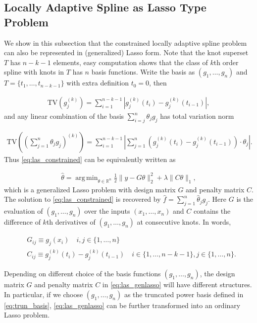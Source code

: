 \documentclass[a4paper]{article}
\DeclareMathOperator*{\argmin}{arg\,min}
\newcommand{\RR}{\mathbb{R}}
\begin{document}
\subsection{Locally Adaptive Spline as Lasso Type Problem}
\label{subsec:lasaslasso}
We show in this subsection that the constrained locally adaptive spline problem can also be represented in (generalized) Lasso form. Note that the knot superset $T$ has $n-k-1$ elements, easy computation shows that the class of $k$th order spline with knots in $T$ has $n$ basis functions. Write the basis as $(g_1,\ldots, g_n)$ and $T = \{t_1,\ldots, t_{n-k-1}\}$ with extra definition $t_0 = 0$, then

\begin{align*}
\text{TV}(g_j^{(k)}) = \sum_{i=1}^{n-k-1} |g_j^{(k)}(t_i) - g_j^{(k)}(t_{i-1})|,
\end{align*}
and any linear combination of the basis $\sum_{i=j}^n \theta_jg_j$ has total variation norm

\begin{align*}
\text{TV}((\sum_{j=1}^n\theta_jg_j)^{(k)}) = \sum_{i=1}^{n-k-1}|\sum_{j=1}^n (g_j^{(k)}(t_i) - g_j^{(k)}(t_{i-1}))\cdot\theta_j|.
\end{align*}
Thus \eqref{eq:las_constrained} can be equivalently written as

\begin{align}
\hat{\theta} = \argmin_{\theta\in\RR^n} \frac{1}{2}\|y-G\theta\|_2^2 + \lambda\|C\theta\|_1,
\label{eq:las_genlasso}
\end{align}
which is a generalized Lasso problem with design matrix $G$ and penalty matrix $C$. The solution to \eqref{eq:las_constrained} is recovered by $\hat{f} = \sum_{j=1}^n \hat{\theta}_jg_j$. Here $G$ is the evaluation of $(g_1,\ldots, g_n)$ over the inputs $(x_1,\ldots, x_n)$ and $C$ contains the difference of $k$th derivatives of $(g_1,\ldots, g_n)$ at consecutive knots. In words,

\begin{equation}
\begin{aligned}
&G_{ij} \equiv g_j(x_i) \quad i,j\in\{1,\ldots, n\}\\
&C_{ij} \equiv g_j^{(k)}(t_i) - g_j^{(k)}(t_{i-1}) \quad i\in\{1,\ldots, n-k-1\}, j\in\{1,\ldots, n\}.
\label{eq:lars_design}
\end{aligned}
\end{equation}

Depending on different choice of the basis functions $(g_1,\ldots, g_n)$, the design matrix $G$ and penalty matrix $C$ in \eqref{eq:las_genlasso} will have different structures. In particular, if we choose $(g_1,\ldots, g_n)$ as the truncated power basis defined in \eqref{eq:trun_basis}, \eqref{eq:las_genlasso} can be further transformed into an ordinary Lasso problem. 
\end{document}
